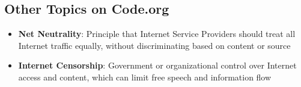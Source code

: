 \subsection*{Other Topics on Code.org}
\begin{itemize}
    \item \textbf{Net Neutrality}: Principle that Internet Service Providers should treat all Internet traffic equally, without discriminating based on content or source
    \item \textbf{Internet Censorship}: Government or organizational control over Internet access and content, which can limit free speech and information flow
\end{itemize}
